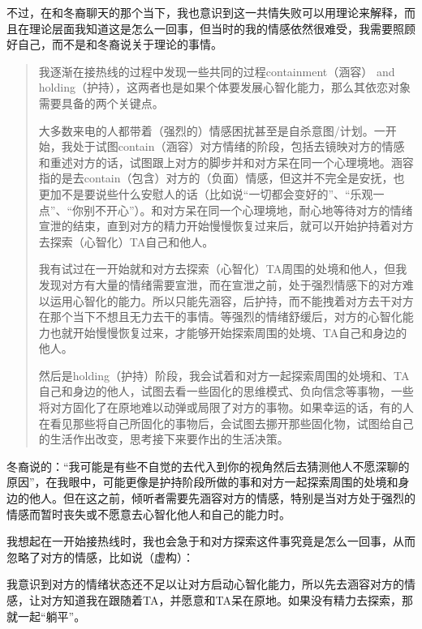 不过，在和冬裔聊天的那个当下，我也意识到这一共情失败可以用理论来解释，而且在理论层面我知道这是怎么一回事，但当时的我的情感依然很难受，我需要照顾好自己，而不是和冬裔说关于理论的事情。

\blockquote{
	我逐渐在接热线的过程中发现一些共同的过程\pozhehao{}containment（涵容） and holding（护持），这两者也是如果个体要发展心智化能力，那么其依恋对象需要具备的两个关键点。

	大多数来电的人都带着（强烈的）情感困扰甚至是自杀意图/计划。一开始，我处于试图contain（涵容）对方情绪的阶段，包括去镜映对方的情感和重述对方的话，试图跟上对方的脚步并和对方呆在同一个心理境地。涵容指的是去contain（包含）对方的（负面）情感，但这并不完全是安抚，也更加不是要说些什么安慰人的话（比如说“一切都会变好的”、“乐观一点”、“你别不开心”）。和对方呆在同一个心理境地，耐心地等待对方的情绪宣泄的结束，直到对方的精力开始慢慢恢复过来后，就可以开始护持着对方去探索（心智化）TA自己和他人。

	我有试过在一开始就和对方去探索（心智化）TA周围的处境和他人，但我发现对方有大量的情绪需要宣泄，而在宣泄之前，处于强烈情感下的对方难以运用心智化的能力。所以只能先涵容，后护持，而不能拽着对方去干对方在那个当下不想且无力去干的事情。等强烈的情绪舒缓后，对方的心智化能力也就开始慢慢恢复过来，才能够开始探索周围的处境、TA自己和身边的他人。

	然后是holding（护持）阶段，我会试着和对方一起探索周围的处境和、TA自己和身边的他人，试图去看一些固化的思维模式、负向信念等事物，一些将对方固化了在原地难以动弹或局限了对方的事物。如果幸运的话，有的人在看见那些将自己所固化的事物后，会试图去挪开那些固化物，试图给自己的生活作出改变，思考接下来要作出的生活决策。

}

冬裔说的：“我可能是有些不自觉的去代入到你的视角然后去猜测他人不愿深聊的原因”，在我眼中，可能更像是护持阶段所做的事\pozhehao{}和对方一起探索周围的处境和身边的他人。但在这之前，倾听者需要先涵容对方的情感，特别是当对方处于强烈的情感而暂时丧失或不愿意去心智化他人和自己的能力时。

我想起在一开始接热线时，我也会急于和对方探索这件事究竟是怎么一回事，从而忽略了对方的情感，比如说（虚构）：


我意识到对方的情绪状态还不足以让对方启动心智化能力，所以先去涵容对方的情感，让对方知道我在跟随着TA，并愿意和TA呆在原地。如果没有精力去探索，那就一起“躺平”。

